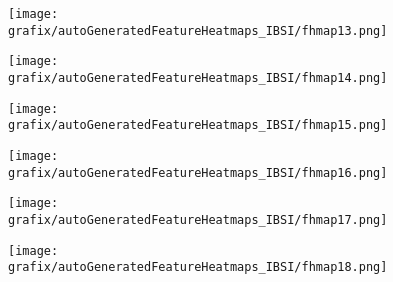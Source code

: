 \hspace{\hsp} 
\begin{subfigure}{\wid\textwidth} 
    \centering 
    \caption{\tiny \sffamily {}} 
    \vspace{\vsp} 
    \texttt{[image: grafix/autoGeneratedFeatureHeatmaps\_IBSI/fhmap13.png]} 
\end{subfigure} 
\hspace{\hsp} 
\begin{subfigure}{\wid\textwidth} 
    \centering 
    \caption{\tiny \sffamily {}} 
    \vspace{\vsp} 
    \texttt{[image: grafix/autoGeneratedFeatureHeatmaps\_IBSI/fhmap14.png]} 
\end{subfigure} 
\hspace{\hsp} 
\begin{subfigure}{\wid\textwidth} 
    \centering 
    \caption{\tiny \sffamily {}} 
    \vspace{\vsp} 
    \texttt{[image: grafix/autoGeneratedFeatureHeatmaps\_IBSI/fhmap15.png]} 
\end{subfigure} 
\hspace{\hsp} 
\begin{subfigure}{\wid\textwidth} 
    \centering 
    \caption{\tiny \sffamily {}} 
    \vspace{\vsp} 
    \texttt{[image: grafix/autoGeneratedFeatureHeatmaps\_IBSI/fhmap16.png]} 
\end{subfigure} 
\hspace{\hsp} 
\begin{subfigure}{\wid\textwidth} 
    \centering 
    \caption{\tiny \sffamily {}} 
    \vspace{\vsp} 
    \texttt{[image: grafix/autoGeneratedFeatureHeatmaps\_IBSI/fhmap17.png]} 
\end{subfigure} 
\hspace{\hsp} 
\begin{subfigure}{\wid\textwidth} 
    \centering 
    \caption{\tiny \sffamily {}} 
    \vspace{\vsp} 
    \texttt{[image: grafix/autoGeneratedFeatureHeatmaps\_IBSI/fhmap18.png]} 
\end{subfigure} 
\hspace{\hsp} 
